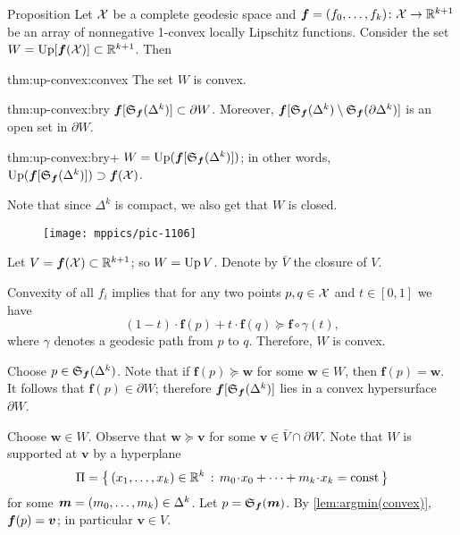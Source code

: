 \begin{thm}{Proposition}\label{thm:up-convex}
Let $\mathcal{X}$ be a complete geodesic space 
and $\bm{f}\z=(f_0,\z\dots,f_\kay)\:\spc{X}\to\RR^{\kay+1}$ 
be an array of nonnegative 1-convex locally Lipschitz functions.
Consider the set $W=\mathop{\rm Up}\nolimits[\bm{f}(\mathcal{X})]\subset\mathbb{R}^{k+1}$.
Then 
\begin{subthm}{thm:up-convex:convex}
The set $W$ is convex.
\end{subthm}

\begin{subthm}{thm:up-convex:bry}
$\bm{f}[\mathfrak{S}_{\bm{f}}(\Delta^k)]\subset\partial W$.
Moreover, $\bm{f}[\mathfrak{S}_{\bm{f}}(\Delta^k)\setminus \mathfrak{S}_{\bm{f}}(\partial\Delta^k)]$ is an open set in $\partial W$.
\end{subthm}

\begin{subthm}{thm:up-convex:bry+}
$W=\mathop{\rm Up}\nolimits(\bm{f}[\mathfrak{S}_{\bm{f}}(\Delta^k)])$; 
in other words, $\mathop{\rm Up}\nolimits(\bm{f}[\mathfrak{S}_{\bm{f}}(\Delta^k)])\supset\bm{f}(\mathcal{X})$.
\end{subthm}




\end{thm}

Note that since $\Delta^k$ is compact, we also get that $W$ is closed.

\begin{wrapfigure}{r}{48mm}
\vskip0mm
\centering
\texttt{[image: mppics/pic-1106]}
\end{wrapfigure}

Let $V=\bm{f}(\mathcal{X})\subset\mathbb{R}^{k+1}$; so $W\z=\Up V$.
Denote by $\bar V$ the closure of $V$.

Convexity of all $f_i$ implies that
for any two points $p,q\in \mathcal{X}$ and $t\in[0,1]$ we have
\[(1-t)\cdot\bm{f}(p)+t\cdot \bm{f}(q)
\succcurlyeq
\bm{f}\circ\gamma(t),\]
where $\gamma$ denotes a geodesic path from $p$ to $q$. 
Therefore, $W$ is convex.

Choose $p\in \mathfrak{S}_{\bm{f}}(\Delta^k)$.
Note that if $\bm{f}(p)\succcurlyeq\bm{w}$ for some $\bm{w}\in W$, then $\bm{f}(p)=\bm{w}$.
It follows that $\bm{f}(p)\in\partial  W$;
therefore $\bm{f}[\mathfrak{S}_{\bm{f}}(\Delta^k)]$ lies in a convex hypersurface $\partial  W$.

Choose $\bm{w}\in W$.
Observe that $\bm{w}\succcurlyeq\bm{v}$ for some $\bm{v}\in \bar V\cap \partial W$.
Note that $W$ is supported at $\bm{v}$ by a hyperplane 
\[\Pi=\set{(x_1,\dots,x_k)\in \RR^k}{m_0\cdot x_0+\dots+m_k\cdot x_k=\const}\]
for some $\bm{m}=(m_0,\dots,m_k)\in\Delta^{k}$.
Let $p=\mathfrak{S}_{\bm f}(\bm m)$.
By \ref{lem:argmin(convex)}, $\bm{f}(p)\z=\bm{v}$;
in particular $\bm{v}\in V$.


